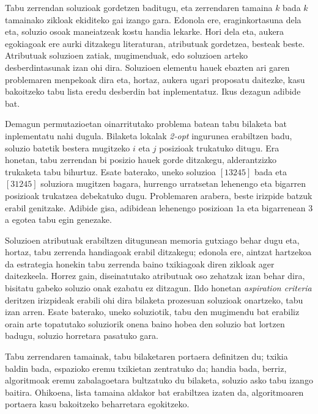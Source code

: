 \documentclass[eu]{ifirak}\usepackage[]{graphicx}\usepackage[]{color}
\begin{document}
Tabu zerrendan soluzioak gordetzen baditugu, eta zerrendaren tamaina $k$ bada $k$ tamainako zikloak ekiditeko gai izango gara. Edonola ere, eraginkortasuna dela eta, soluzio osoak maneiatzeak kostu handia lekarke. Hori dela eta, aukera egokiagoak ere aurki ditzakegu literaturan, atributuak gordetzea, besteak beste. Atributuak soluzioen zatiak, mugimenduak, edo soluzioen arteko desberdintasunak izan ohi dira. Soluzioen elementu hauek ebazten ari garen problemaren menpekoak dira eta, hortaz, aukera ugari proposatu daitezke, kasu bakoitzeko tabu lista eredu desberdin bat inplementatuz. Ikus dezagun adibide bat.

\begin{tcolorbox}
\begin{ifexample}
Demagun permutazioetan oinarritutako problema batean tabu bilaketa bat inplementatu nahi dugula. Bilaketa lokalak {\em 2-opt} ingurunea erabiltzen badu, soluzio batetik bestera mugitzeko $i$ eta $j$ posizioak trukatuko ditugu. Era honetan, tabu zerrendan bi posizio hauek gorde ditzakegu, alderantzizko trukaketa tabu bihurtuz. Esate baterako, uneko soluzioa $[13245]$ bada eta $[31245]$ soluziora mugitzen bagara, hurrengo urratsetan lehenengo eta bigarren posizioak trukatzea debekatuko dugu. Problemaren arabera, beste irizpide batzuk erabil genitzake. Adibide gisa, adibidean lehenengo posizioan $1$a eta bigarrenean $3$a egotea tabu egin genezake.
\end{ifexample}
\end{tcolorbox}

Soluzioen atributuak erabiltzen ditugunean memoria gutxiago behar dugu eta, hortaz, tabu zerrenda handiagoak erabil ditzakegu; edonola ere, aintzat hartzekoa da estrategia honekin tabu zerrenda baino txikiagoak diren zikloak ager daitezkeela. Horrez gain, diseinatutako atributuak oso zehatzak izan behar dira, bisitatu gabeko soluzio onak ezabatu ez ditzagun. Ildo honetan \textit{aspiration criteria} deritzen irizpideak erabili ohi dira bilaketa prozesuan soluzioak onartzeko, tabu izan arren. Esate baterako, uneko soluziotik, tabu den mugimendu bat erabiliz orain arte topatutako soluziorik onena baino hobea den soluzio bat lortzen badugu, soluzio horretara pasatuko gara.

Tabu zerrendaren tamainak, tabu bilaketaren portaera definitzen du; txikia baldin bada, espazioko eremu txikietan zentratuko da; handia bada, berriz, algoritmoak eremu zabalagoetara bultzatuko du bilaketa, soluzio asko tabu izango baitira. Ohikoena, lista tamaina aldakor bat erabiltzea izaten da, algoritmoaren portaera kasu bakoitzeko beharretara egokitzeko.
\end{document}
